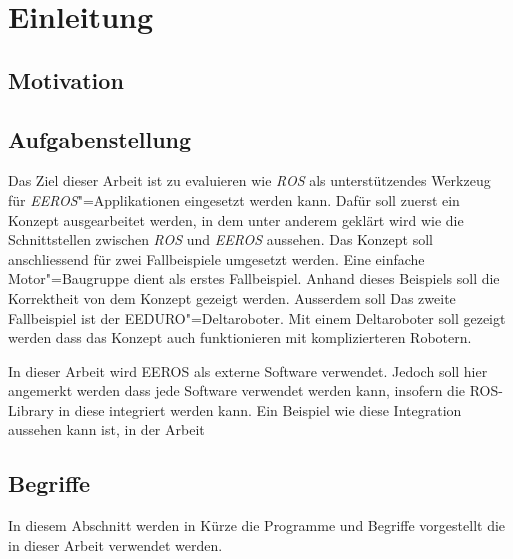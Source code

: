 \chapter{Einleitung}
\section{Motivation}





\section{Aufgabenstellung}
Das Ziel dieser Arbeit ist zu evaluieren wie \textit{ROS} als unterstützendes Werkzeug für \textit{EEROS}"=Applikationen eingesetzt werden kann.
Dafür soll zuerst ein Konzept ausgearbeitet werden, in dem unter anderem geklärt wird wie die Schnittstellen zwischen \textit{ROS} und \textit{EEROS} aussehen.
Das Konzept soll anschliessend für zwei Fallbeispiele umgesetzt werden.
Eine einfache Motor"=Baugruppe dient als erstes Fallbeispiel.
Anhand dieses Beispiels soll die Korrektheit von dem Konzept gezeigt werden.
Ausserdem soll %
Das zweite Fallbeispiel ist der EEDURO"=Deltaroboter.
Mit einem Deltaroboter soll gezeigt werden dass das Konzept auch funktionieren mit komplizierteren Robotern.



In dieser Arbeit wird EEROS als externe Software verwendet.
Jedoch soll hier angemerkt werden dass jede Software verwendet werden kann, insofern die ROS-Library in diese integriert werden kann.
Ein Beispiel wie diese Integration aussehen kann ist, in der Arbeit %

\section{Begriffe}
In diesem Abschnitt werden in Kürze die Programme und Begriffe vorgestellt  die in dieser Arbeit verwendet werden.

